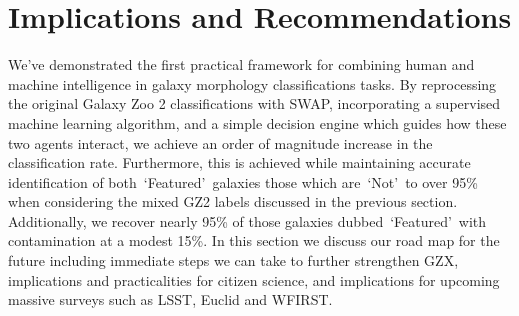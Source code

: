 \documentclass[twocolumn]{aastex6}
\newcommand{\feat}{`Featured'}
\newcommand{\notfeat}{`Not'}
\begin{document}

\section{Implications and Recommendations}\label{sec: visions}

We've demonstrated the first practical framework for combining human and machine
 intelligence in galaxy morphology classifications tasks. By reprocessing the original
Galaxy Zoo 2 classifications with SWAP, incorporating a supervised machine learning
algorithm, and a simple decision engine which guides how these two agents interact, 
we achieve an order of magnitude increase in the classification rate. Furthermore, 
this is achieved while maintaining accurate identification of both~\feat~galaxies 
those which are~\notfeat~to over 95\% when considering the mixed GZ2 labels
discussed in the previous section. Additionally, we recover nearly 95\% of those
galaxies dubbed~\feat~with contamination at a modest 15\%. In this section we 
discuss our road map for the future including immediate steps we can take to further
strengthen GZX, implications and practicalities for citizen science, and implications
for upcoming massive surveys such as LSST, Euclid and WFIRST. 
\end{document}
